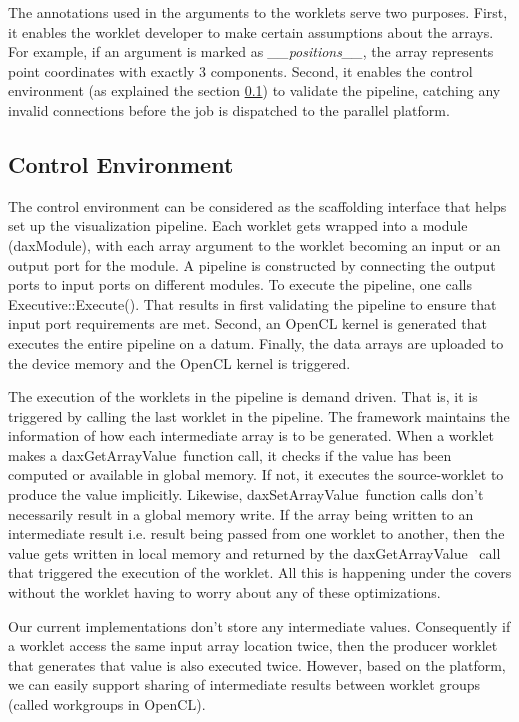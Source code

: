 \documentclass{vgtc}                          %
\begin{document}
The annotations used in the arguments to the worklets serve two purposes.
First, it enables the worklet developer to make certain assumptions about
the arrays. For example, if an argument is marked as \emph{\_\_positions\_\_}, the
array represents point coordinates with exactly 3 components.
Second, it enables the control environment (as explained the section \ref{sec:ControlEnvironment}) to validate
the pipeline, catching any invalid connections before the job is dispatched to
the parallel platform.

\subsection{Control Environment}
\label{sec:ControlEnvironment}

The control environment can be considered as the scaffolding interface that helps set up the
visualization pipeline. Each worklet gets wrapped into a module (daxModule),
with each array argument to the worklet becoming an input or an output port for
the module. A pipeline is constructed by connecting the output ports to input
ports on different modules. To execute the pipeline, one calls
Executive::Execute(). That results in first validating the pipeline to ensure
that input port requirements are met. Second, an OpenCL kernel is generated that
executes the entire pipeline on a datum. Finally, the data arrays are
uploaded to the device memory and the OpenCL kernel is triggered.

The execution of the worklets in the pipeline is demand driven. That is, it is
triggered by calling the last worklet in the pipeline. The framework maintains
the information of how each intermediate array is to be generated. When a
worklet makes a daxGetArrayValue\textasteriskcentered~function call, it checks
if the value has been computed or available in global memory. If not, it
executes the source-worklet to produce the value implicitly. Likewise,
daxSetArrayValue\textasteriskcentered~function calls don't necessarily result
in a global memory write. If the array being written to an intermediate result
i.e. result being passed from one worklet to another, then the value gets
written in local memory and returned by the
daxGetArrayValue\textasteriskcentered~ call that triggered the execution of the
worklet. All this is happening under the covers without the worklet having to
worry about any of these optimizations.

Our current implementations don't store any intermediate values. Consequently if
a worklet access the same input array location twice, then the producer worklet
that generates that value is also executed twice. However, based on the
platform, we can easily support sharing of intermediate results between worklet
groups (called workgroups in OpenCL).
\end{document}

